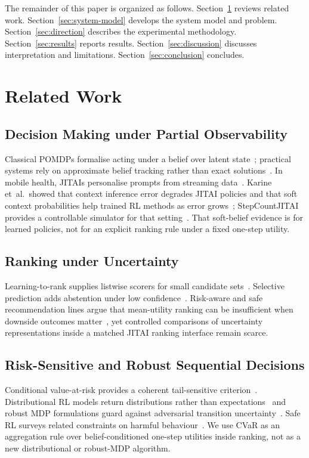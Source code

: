 \documentclass[journal]{IEEEtran}
\begin{document}
The remainder of this paper is organized as follows.
Section~\ref{sec:related} reviews related work.
Section~\ref{sec:system-model} develops the system model and problem.
Section~\ref{sec:direction} describes the experimental methodology.
Section~\ref{sec:results} reports results.
Section~\ref{sec:discussion} discusses interpretation and limitations.
Section~\ref{sec:conclusion} concludes.

\section{Related Work}
\label{sec:related}

\subsection{Decision Making under Partial Observability}
Classical POMDPs formalise acting under a belief over latent state~\cite{kaelbling1998pomdp}; practical systems rely on approximate belief tracking rather than exact solutions~\cite{pineau2003point}.
In mobile health, JITAIs personalise prompts from streaming data~\cite{nahum2018jitai,liao2020heartsteps,tewari2017bandits}.
Karine et~al.\ showed that context inference error degrades JITAI policies and that soft context probabilities help trained RL methods as error grows~\cite{karine2023uai}; StepCountJITAI provides a controllable simulator for that setting~\cite{karine2024stepcount,towers2024gymnasium}.
That soft-belief evidence is for learned policies, not for an explicit ranking rule under a fixed one-step utility.

\subsection{Ranking under Uncertainty}
Learning-to-rank supplies listwise scorers for small candidate sets~\cite{burges2010lambdamart,liu2009ltr,ke2017lightgbm}.
Selective prediction adds abstention under low confidence~\cite{elyaniv2010selective,geifman2017selective}.
Risk-aware and safe recommendation lines argue that mean-utility ranking can be insufficient when downside outcomes matter~\cite{garcia2015saferl}, yet controlled comparisons of uncertainty representations inside a matched JITAI ranking interface remain scarce.

\subsection{Risk-Sensitive and Robust Sequential Decisions}
Conditional value-at-risk provides a coherent tail-sensitive criterion~\cite{rockafellar2000cvar,chow2015cvar}.
Distributional RL models return distributions rather than expectations~\cite{bellemare2017distributional,dabney2018qr} and robust MDP formulations guard against adversarial transition uncertainty~\cite{nilim2005robust,iyengar2005robust}.
Safe RL surveys related constraints on harmful behaviour~\cite{garcia2015saferl}.
We use CVaR as an aggregation rule over belief-conditioned one-step utilities inside ranking, not as a new distributional or robust-MDP algorithm.
\end{document}
